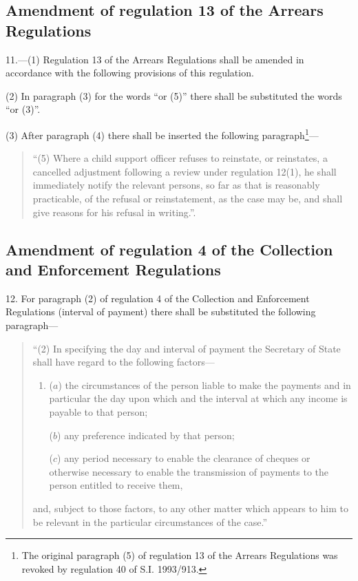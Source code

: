 \documentclass[a4paper]{article}
\begin{document}
\subsection[11. Amendment of regulation 13 of the Arrears Regulations]{Amendment of regulation 13 of the Arrears Regulations}

11.—(1) Regulation 13 of the Arrears Regulations shall be amended in accordance with the following provisions of this regulation.

(2) In paragraph (3) for the words “or (5)” there shall be substituted the words “or (3)”.

(3) After paragraph (4) there shall be inserted the following paragraph\footnote{\frenchspacing The original paragraph (5) of regulation 13 of the Arrears Regulations was revoked by regulation 40 of S.I. 1993/913.}—
\begin{quotation}
“(5) Where a child support officer refuses to reinstate, or reinstates, a cancelled adjustment following a review under regulation 12(1), he shall immediately notify the relevant persons, so far as that is reasonably practicable, of the refusal or reinstatement, as the case may be, and shall give reasons for his refusal in writing.”.
\end{quotation}

\subsection[12. Amendment of regulation 4 of the Collection and Enforcement Regulations]{Amendment of regulation 4 of the Collection and Enforcement Regulations}

12.  For paragraph (2) of regulation 4 of the Collection and Enforcement Regulations (interval of payment) there shall be substituted the following paragraph—
\begin{quotation}
“(2) In specifying the day and interval of payment the Secretary of State shall have regard to the following factors—
\begin{enumerate}\item[]
($a$) the circumstances of the person liable to make the payments and in particular the day upon which and the interval at which any income is payable to that person;

($b$) any preference indicated by that person;

($c$) any period necessary to enable the clearance of cheques or otherwise necessary to enable the transmission of payments to the person entitled to receive them,
\end{enumerate}
and, subject to those factors, to any other matter which appears to him to be relevant in the particular circumstances of the case.''
\end{quotation}
\end{document}
